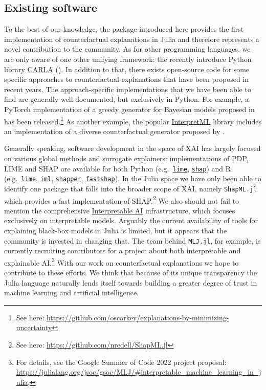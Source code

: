 \documentclass{juliacon}
\begin{document}
\hypertarget{existing-software}{%
\subsection{Existing software}\label{existing-software}}

To the best of our knowledge, the package introduced here provides the
first implementation of counterfactual explanations in Julia and
therefore represents a novel contribution to the community. As for other
programming languages, we are only aware of one other unifying
framework: the recently introduce Python library
\href{https://carla-counterfactual-and-recourse-library.readthedocs.io/en/latest/?badge=latest}{CARLA}
(\cite{pawelczyk2021carla}). In addition to that, there exists
open-source code for some specific approaches to counterfactual
explanations that have been proposed in recent years. The
approach-specific implementations that we have been able to find are
generally well documented, but exclusively in Python. For example, a
PyTorch implementation of a greedy generator for Bayesian models
proposed in \cite{schut2021generating} has been released.\footnote{See
  here:
  \url{https://github.com/oscarkey/explanations-by-minimizing-uncertainty}}
As another example, the popular
\href{https://github.com/interpretml}{InterpretML} library includes an
implementation of a diverse counterfactual generator proposed by
\cite{mothilal2020explaining}.

Generally speaking, software development in the space of XAI has largely
focused on various global methods and surrogate explainers:
implementations of PDP, LIME and SHAP are available for both Python
(e.g.~\href{https://github.com/marcotcr/lime}{\texttt{lime}},
\href{https://github.com/slundberg/shap}{\texttt{shap}}) and R
(e.g.~\href{https://cran.r-project.org/web/packages/lime/index.html}{\texttt{lime}},
\href{https://cran.r-project.org/web/packages/lime/index.html}{\texttt{iml}},
\href{https://modeloriented.github.io/shapper/}{\texttt{shapper}},
\href{https://github.com/bgreenwell/fastshap}{\texttt{fastshap}}). In
the Julia space we have only been able to identify one package that
falls into the broader scope of XAI, namely \texttt{ShapML.jl} which
provides a fast implementation of SHAP.\footnote{See here:
  \url{https://github.com/nredell/ShapML.jl}} We also should not fail to
mention the comprehensive
\href{https://docs.interpretable.ai/stable/IAIBase/data/}{Interpretable
AI} infrastructure, which focuses exclusively on interpretable models.
Arguably the current availability of tools for explaining black-box
models in Julia is limited, but it appears that the community is
invested in changing that. The team behind \texttt{MLJ.jl}, for example,
is currently recruiting contributors for a project about both
interpretable and explainable AI.\footnote{For details, see the Google
  Summer of Code 2022 project proposal:
  \url{https://julialang.org/jsoc/gsoc/MLJ/\#interpretable_machine_learning_in_julia}.}
With our work on counterfactual explanations we hope to contribute to
these efforts. We think that because of its unique transparency the
Julia language naturally lends itself towards building a greater degree
of trust in machine learning and artificial intelligence.
\end{document}

